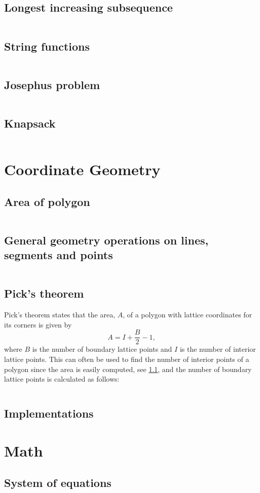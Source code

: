\documentclass[8pt,a4paper,landscape,oneside]{amsart}
\newcommand{\codep}[1]{\inputminted[fontsize=\large,tabsize=2,baselinestretch=1]{py}{code/#1}}
\begin{document}
\begin{multicols*}{2}
\begin{large}
\subsection{Longest increasing subsequence}
\codep{lis.py}
\subsection{String functions}
\codep{stringmatching.py}
\subsection{Josephus problem}
\codep{josephus.py}
\subsection{Knapsack}
\codep{knapsack.py}
\section{Coordinate Geometry}
\subsection{Area of polygon}\label{sec: polyarea}
\codep{polygonArea.py}
\subsection{General geometry operations on lines, segments and points}
\codep{geometry.py}
\subsection{Pick's theorem}
Pick's theorem states that the area, $A$, of a polygon with lattice coordinates for its corners is given by $$A=I+\frac{B}{2}-1,$$ where $B$ is the number of boundary lattice points and $I$ is the number of interior lattice points. This can often be used to find the number of interior points of a polygon since the area is easily computed, see \ref{sec: polyarea}, and the number of boundary lattice points is calculated as follows:
\codep{boundarypoints.py}
\subsection{Implementations}
\section{Math}
\subsection{System of equations}
\codep{gaussianelimination.py}

\end{large}
\end{multicols*}
\end{document}
